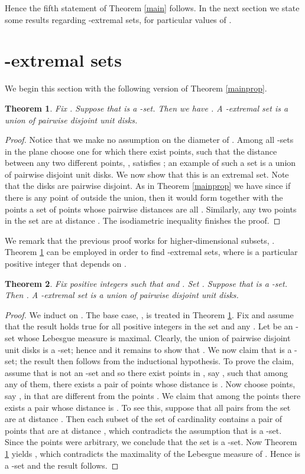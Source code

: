 \documentclass[12pt]{article}
\newtheorem{thm}{Theorem}[section]
\begin{document}
Hence the fifth statement of Theorem \ref{main} follows. In the next section we state some 
results regarding
-extremal sets, for particular values of .

\section{-extremal sets}
\label{abproperty}

We begin this section with the following version of Theorem \ref{mainprop}.

\begin{thm}\label{atwo}  Fix . Suppose that  is a -set.
Then we have . A -extremal set is a 
union of  pairwise disjoint unit disks.
\end{thm}
\begin{proof} Notice that we make no assumption on the diameter of . 
Among all -sets in the plane choose one 
for which 
there exist  points,  such that the distance between 
any two different points, , satisfies ;
an example of such a set is a union of  pairwise disjoint unit disks.
We now show that this is an extremal set.
Note that the disks  are pairwise disjoint. 
As in Theorem \ref{mainprop}
we have  since if there is any point of  outside the union, then it 
would form together with the points    a set of  points whose pairwise distances 
are all .
Similarly, any two points in the set  are at distance .
The isodiametric inequality finishes the proof.
\end{proof}

We remark that the previous proof works for higher-dimensional subsets, .
Theorem \ref{atwo} can be employed in order to find -extremal sets, where  is a particular 
positive integer that depends on .  

\begin{thm} Fix positive integers  such that  and . 
Set . Suppose that  is a -set.
Then . A -extremal set 
is a union of  pairwise disjoint unit disks.
\end{thm}
\begin{proof} 
We induct on .
The base case, , is treated in Theorem \ref{atwo}. Fix  and
assume that the result holds true for all positive integers in the set  and any . 
Let  be an -set  whose Lebesgue 
measure is maximal. Clearly, the union of  pairwise disjoint 
unit disks is a -set; hence  and it remains to 
show that . We now claim that  is a -set;
the result then follows from the inductional hypothesis. 
To prove the claim, assume that  is not an -set and so there exist 
 points in , say , such that among any  of them, 
there exists a pair of points whose distance is . 
Now choose  points, say , in  that 
are different from the points . 
We claim that among the points   there exists a pair whose distance is .
To see this, suppose that all pairs from the set   are at distance . 
Then each subset of  
the set  of cardinality  contains
a pair of points that are at distance , which
contradicts  the assumption that  is a -set. 
Since the points  were arbitrary, we conclude that
the set  is a -set.  
Now Theorem \ref{atwo} yields
, which 
contradicts the maximality of 
the Lebesgue measure of . Hence  is a -set and the result follows.
\end{proof}
\end{document}

